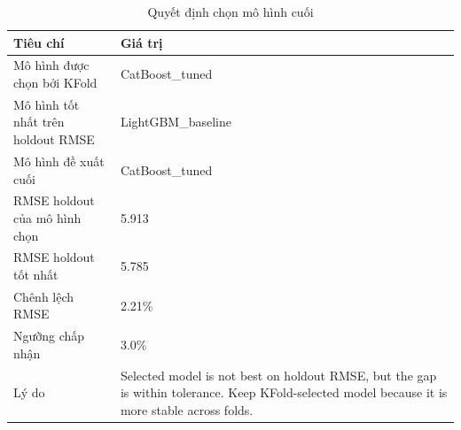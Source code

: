 \begin{table}[H]
\centering
\caption{Quyết định chọn mô hình cuối}
\label{tab:final-decision}
\footnotesize
\setlength{\tabcolsep}{5pt}
\renewcommand{\arraystretch}{0.95}
\begin{tabular}{p{}p{}}
\toprule
Tiêu chí & Giá trị \\
\midrule
Mô hình được chọn bởi KFold & CatBoost\_tuned \\
Mô hình tốt nhất trên holdout RMSE & LightGBM\_baseline \\
Mô hình đề xuất cuối & CatBoost\_tuned \\
RMSE holdout của mô hình chọn & 5.913 \\
RMSE holdout tốt nhất & 5.785 \\
Chênh lệch RMSE & 2.21\% \\
Ngưỡng chấp nhận & 3.0\% \\
Lý do & Selected model is not best on holdout RMSE, but the gap is within tolerance. Keep KFold-selected model because it is more stable across folds. \\
\bottomrule
\end{tabular}
\end{table}
